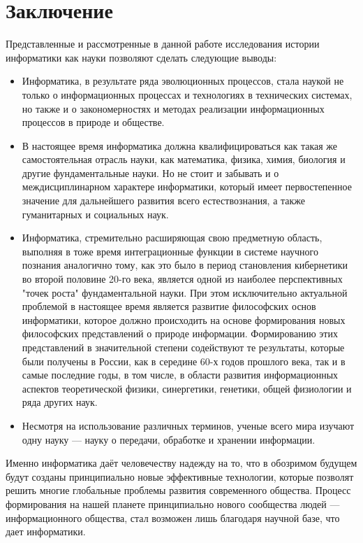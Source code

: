 \chapter*{Заключение}						%


Представленные и рассмотренные в данной работе исследования истории информатики как науки позволяют сделать следующие выводы:
\begin{itemize}

\item Информатика, в результате ряда эволюционных процессов, стала наукой не только о информационных процессах и технологиях в технических системах, но также и о закономерностях и методах реализации информационных процессов в природе и обществе.
\item  В настоящее время информатика должна квалифицироваться как такая же самостоятельная отрасль 
науки, как математика, физика, химия, биология и другие фундаментальные науки. Но не стоит и забывать и о междисциплинарном характере информатики, который имеет первостепенное значение для дальнейшего развития всего естествознания, а также гуманитарных и социальных наук.
\item Информатика, стремительно расширяющая свою предметную область, выполняя в тоже время интеграционные функции в системе научного познания аналогично тому, как это  было в период становления кибернетики во второй половине 20-го века, является одной из наиболее перспективных "точек роста" фундаментальной науки. При этом исключительно актуальной проблемой в настоящее время является развитие философских основ информатики, которое должно происходить на основе формирования новых философских представлений о природе информации. Формированию этих представлений в значительной степени содействуют те  результаты, которые  были получены в России, как в середине 60-х годов прошлого века, так и в самые последние годы, в том числе, в области развития информационных аспектов теоретической физики, синергетики, генетики, общей физиологии и ряда других наук.
\item  Несмотря на использование различных терминов, ученые всего мира изучают одну науку --- науку о передачи, обработке и хранении информации.
\end{itemize}

Именно информатика даёт человечеству надежду на то, что в обозримом будущем будут созданы принципиально новые эффективные технологии, которые позволят решить многие глобальные проблемы развития современного общества. Процесс формирования на нашей планете принципиально нового сообщества людей --- информационного общества, стал возможен лишь благодаря научной базе, что дает информатики. 

\clearpage